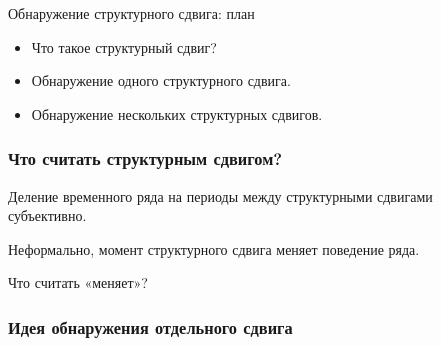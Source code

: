 
\begin{frame} %


\end{frame}



\begin{frame}{Обнаружение структурного сдвига: план}
  \begin{itemize}[<+->]
    \item Что такое \alert{структурный сдвиг}? 
    \item Обнаружение \alert{одного} структурного сдвига. 
    \item Обнаружение \alert{нескольких} структурных сдвигов. 
  \end{itemize}

\end{frame}

\begin{frame}
  \frametitle{Что считать структурным сдвигом?}

  \pause 
  Деление временного ряда на периоды между структурными сдвигами \alert{субъективно}.

  \pause
  Неформально, момент структурного сдвига \alert{меняет} поведение ряда. 

  \pause
  Что считать «меняет»?

\end{frame}


\begin{frame}
  \frametitle{Идея обнаружения отдельного сдвига}

  \begin{itemize}
    
\end{itemize}

\end{frame}


